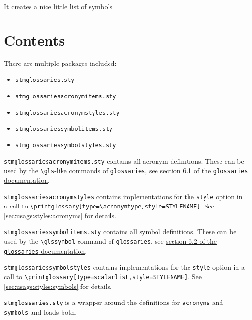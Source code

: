 \documentclass{scrartcl}
\begin{document}
It creates a nice little list of symbols

\glstocfalse
\printglossary[type=example1list  ,style=stmsymbolstyle  ,nonumberlist]
\glstoctrue

% 

\section{Contents}
\label{sec:contents}

There are multiple packages included:

\begin{itemize}[noitemsep]
  \item \texttt{stmglossaries.sty}
  \item \texttt{stmglossariesacronymitems.sty}
  \item \texttt{stmglossariesacronymstyles.sty}
  \item \texttt{stmglossariessymbolitems.sty}
  \item \texttt{stmglossariessymbolstyles.sty}
\end{itemize}

\texttt{stmglossariesacronymitems.sty} contains all acronym definitions. These can be used by the \texttt{\textbackslash gls}-like commands of \texttt{glossaries}, see \href{http://ftp.fau.de/ctan/macros/latex/contrib/glossaries/glossaries-user.pdf#section.6.1}{section 6.1 of the \texttt{glossaries} documentation}.

\texttt{stmglossariesacronymstyles} contains implementations for the \texttt{style} option in a call to \verb+\printglossary[type=\acronymtype,style=STYLENAME]+. See \autoref{sec:usage:styles:acronyms} for details.

\texttt{stmglossariessymbolitems.sty} contains all symbol definitions. These can be used by the \texttt{\textbackslash glssymbol} command of \texttt{glossaries}, see \href{http://ftp.fau.de/ctan/macros/latex/contrib/glossaries/glossaries-user.pdf#section.6.2}{section 6.2 of the \texttt{glossaries} documentation}.

\texttt{stmglossariessymbolstyles} contains implementations for the \texttt{style} option in a call to \verb+\printglossary[type=scalarlist,style=STYLENAME]+. See \autoref{sec:usage:styles:symbols} for details.

\texttt{stmglossaries.sty} is a wrapper around the definitions for \texttt{acronyms} and \texttt{symbols} and loads both.
\end{document}
